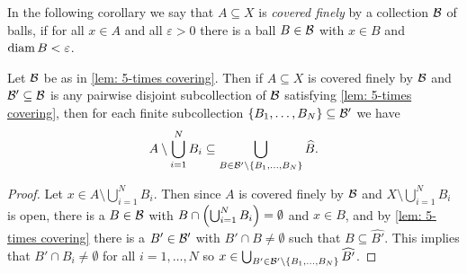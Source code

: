 In the following corollary we say that $A \subseteq X$ is \emph{covered finely} by a collection $\mathcal{B}$ of balls, if for all $x \in A$ and all $\varepsilon > 0$ there is a ball $B \in \mathcal{B}$ with $x \in B$ and $\operatorname{diam} B < \varepsilon$.
\begin{corollary}\label{cor: fine cover}
Let $\mathcal{B}$ be as in \cref{lem: 5-times covering}. Then if $A \subseteq X$ is covered finely by $\mathcal{B}$ and $\mathcal{B}' \subseteq \mathcal{B}$ is any pairwise disjoint subcollection of $\mathcal{B}$ satisfying \cref{lem: 5-times covering}, then for each finite subcollection $\{B_1, \dots, B_N\} \subseteq \mathcal{B}'$ we have
\[
    A \setminus \bigcup_{i=1}^N B_i \subseteq \bigcup_{B \in \mathcal{B}' \setminus \{B_1, \dots, B_N\}} \widehat B.
\]
\end{corollary}
\begin{proof}
Let $x \in A \setminus \bigcup_{i=1}^N B_i$. Then since $A$ is covered finely by $\mathcal{B}$ and $X \setminus \bigcup_{i=1}^N B_i$ is open, there is a $B \in \mathcal{B}$ with $B \cap \left(\bigcup_{i=1}^N B_i\right) = \emptyset$ and $x \in B$, and by \cref{lem: 5-times covering} there is a $B' \in \mathcal{B}'$ with $B' \cap B \neq \emptyset$ such that $B \subseteq \widehat{B'}$. This implies that $B' \cap B_i \neq \emptyset$ for all $i =1, \dots, N$ so $x \in \bigcup_{B' \in \mathcal{B}' \setminus \{B_1, \dots, B_N \}} \widehat{B'}$.
\end{proof}

